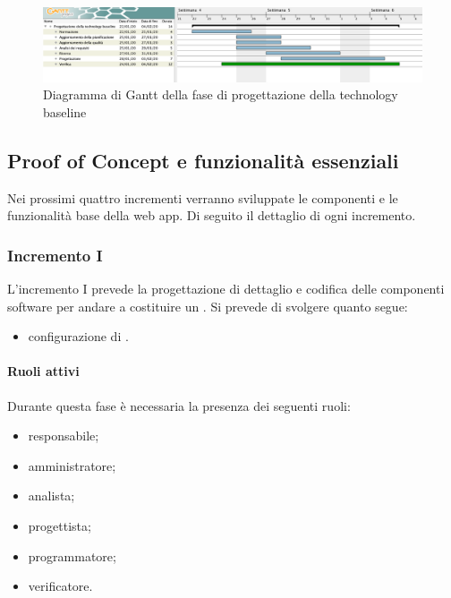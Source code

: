         \begin{landscape}

          \begin{figure}[H]
            \centering
            \includegraphics[width=\linewidth]{images/gantt/progettazioneTechnologyBaseline} %
            \caption{Diagramma di Gantt della fase di progettazione della technology baseline}
          \end{figure}

		\end{landscape}		


		
		\subsection{Proof of Concept e funzionalità essenziali}
		Nei prossimi quattro incrementi verranno sviluppate le componenti e le funzionalità base della web app. \newline
		Di seguito il dettaglio di ogni incremento.

		\subsubsection{Incremento I}
			
			L'incremento I prevede la progettazione di dettaglio e codifica delle componenti software per andare a costituire un . Si prevede di svolgere quanto segue:
			\begin{itemize}
				\item configurazione di .
			\end{itemize}
			
			\paragraph{Ruoli attivi}
			
				Durante questa fase è necessaria la presenza dei seguenti ruoli:
				\begin{itemize}
					\item responsabile;
					\item amministratore;
					\item analista;
					\item progettista;
					\item programmatore;
					\item verificatore.
				\end{itemize}
			
